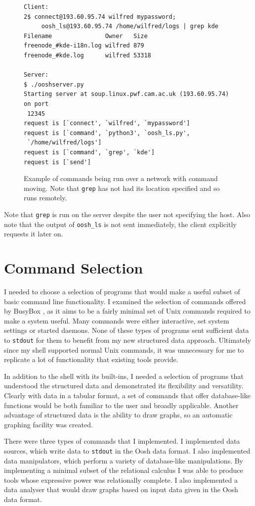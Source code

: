 \documentclass[12pt,twoside,notitlepage]{report}
\begin{document}
\begin{figure}
\begin{Verbatim}[frame=single,framerule=0.2pt,framesep=5pt]
Client:
2$ connect@193.60.95.74 wilfred mypassword;
     oosh_ls@193.60.95.74 /home/wilfred/logs | grep kde
Filename               Owner   Size
freenode_#kde-i18n.log wilfred 879
freenode_#kde.log      wilfred 53318

Server:
$ ./ooshserver.py
Starting server at soup.linux.pwf.cam.ac.uk (193.60.95.74) on port
 12345
request is [`connect', `wilfred', `mypassword']
request is [`command', `python3', `oosh_ls.py',
 `/home/wilfred/logs']
request is [`command', `grep', `kde']
request is [`send']
\end{Verbatim}
  \caption{Example of commands being run over a network with command
    moving. Note that {\tt grep} has not had its location specified
    and so runs remotely.}
  \label{grepexample}
\end{figure}

Note that {\tt grep} is run on the server despite the user not specifying
the host. Also note that the output of {\tt oosh\_ls} is not sent
immediately, the client explicitly requests it later on.

\section{Command Selection}
I needed to choose a selection of programs that would make a useful
subset of basic command line functionality. I examined the selection
of commands offered by BusyBox \cite{busybox}, as it aims to be a
fairly minimal set of Unix commands required to make a system
useful. Many commands were either interactive, set system settings or
started daemons. None of these types of programs sent sufficient data
to {\tt stdout} for them to benefit from my new structured data
approach. Ultimately since my shell supported normal Unix commands, it
was unnecessary for me to replicate a lot of functionality that existing
tools provide.

In addition to the shell with its built-ins, I needed a selection of
programs that understood the structured data and demonstrated its
flexibility and versatility. Clearly with data in a tabular format, a
set of commands that offer database-like functions would be both
familiar to the user and broadly applicable. Another advantage
of structured data is the ability to draw graphs, so an automatic
graphing facility was created.

There were three types of commands that I implemented. I implemented
data sources, which write data to {\tt stdout} in the Oosh data
format. I also implemented data manipulators, which perform a variety
of database-like manipulations. By implementing a minimal subset of
the relational calculus I was able to produce tools whose expressive
power was relationally complete. I also implemented a data analyser
that would draw graphs based on input data given in the Oosh data
format.
\end{document}
